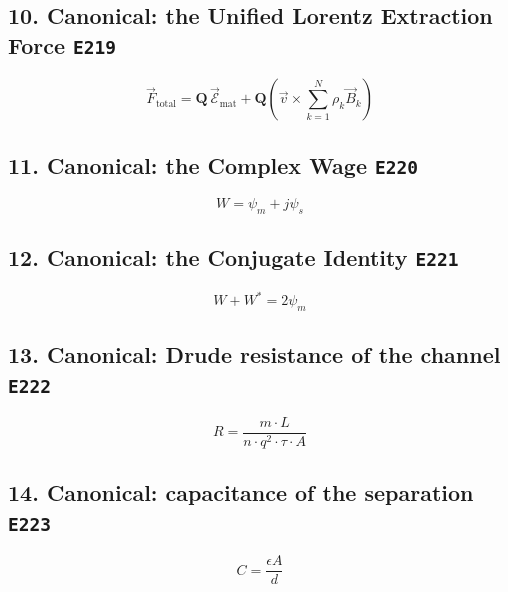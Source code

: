 \documentclass[11pt]{article}
\begin{document}
\subsection*{10. Canonical: the Unified Lorentz Extraction Force \hfill \texttt{E219}}

\begin{equation}\label{eq:19.5-unified-lorentz-force-registry}
\vec{F}_{\text{total}} = \mathbf{Q}\,\vec{\mathcal{E}}_{\text{mat}} + \mathbf{Q}\left(\vec{v} \times \sum_{k=1}^{N} \rho_k \vec{B}_k\right)
\end{equation}

\subsection*{11. Canonical: the Complex Wage \hfill \texttt{E220}}

\begin{equation}\label{eq:19.6-complex-wage-registry}
W = \psi_m + j\psi_s
\end{equation}

\subsection*{12. Canonical: the Conjugate Identity \hfill \texttt{E221}}

\begin{equation}\label{eq:19.7-solidarity-cancellation-registry}
W + W^* = 2\psi_m
\end{equation}

\subsection*{13. Canonical: Drude resistance of the channel \hfill \texttt{E222}}

\begin{equation}\label{eq:19.8-systemic-resistance-registry}
R = \frac{m \cdot L}{n \cdot q^2 \cdot \tau \cdot A}
\end{equation}

\subsection*{14. Canonical: capacitance of the separation \hfill \texttt{E223}}

\begin{equation}\label{eq:19.9-enclosure-capacitance-registry}
C = \frac{\epsilon A}{d}
\end{equation}
\end{document}
